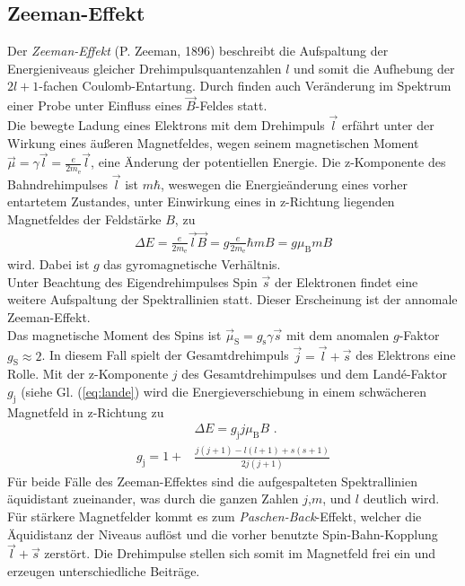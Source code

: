 \documentclass[numbers=noenddot,12pt,a4paper]{scrartcl}
\newcommand{\ix}[1]{_\text{#1}}
\newcommand{\tilt}[1]{\textit{#1}}
\begin{document}
\subsection{Zeeman-Effekt}\label{subsec:zeeman}
Der \tilt{Zeeman-Effekt} (P. Zeeman, 1896) beschreibt die Aufspaltung der Energieniveaus gleicher Drehimpulsquantenzahlen $l$ und somit die Aufhebung der $2l+1$-fachen Coulomb-Entartung. Durch finden auch Veränderung im Spektrum einer Probe unter Einfluss eines $\vec{B}$-Feldes statt.\\
Die bewegte Ladung eines Elektrons mit dem Drehimpuls $\vec{l}$ erfährt unter der Wirkung eines äußeren Magnetfeldes, wegen seinem magnetischen Moment $\vec{\mu}=\gamma\vec{l}=\frac{e}{2m\ix{e}}\vec{l}$, eine Änderung der potentiellen Energie. Die z-Komponente des Bahndrehimpulses $\vec{l}$ ist $m\hbar$, weswegen die Energieänderung eines vorher entartetem Zustandes, unter Einwirkung eines in z-Richtung liegenden Magnetfeldes der Feldstärke $B$, zu
\begin{align}
	\Delta E=\frac{e}{2m\ix{e}}\vec{l}\vec{B}=g\frac{e}{2m\ix{e}}\hbar mB=g\mu\ix{B}mB
\end{align}
wird. Dabei ist $g$ das gyromagnetische Verhältnis.\\
Unter Beachtung des Eigendrehimpulses Spin $\vec{s}$ der Elektronen findet eine weitere Aufspaltung der Spektrallinien statt. Dieser Erscheinung ist der annomale Zeeman-Effekt.\\
Das magnetische Moment des Spins ist $\vec{\mu}\ix{S}=g\ix{s}\gamma\vec{s}$ mit dem anomalen $g$-Faktor $g\ix{S}\approx2$. In diesem Fall spielt der Gesamtdrehimpuls $\vec{j}=\vec{l}+\vec{s}$ des Elektrons eine Rolle. Mit der z-Komponente $j$ des Gesamtdrehimpulses und dem Landé-Faktor $g\ix{j}$ (siehe Gl. (\ref{eq:lande}) wird die Energieverschiebung in einem schwächeren Magnetfeld in z-Richtung zu
\begin{align}
	&\Delta E=g\ix{j}j\mu\ix{B}B \,\,. \\
	g\ix{j}=1+&\frac{j\left(j+1\right)-l\left(l+1\right)+s\left(s+1\right)}{2j\left(j+1\right)} \label{eq:lande}
\end{align}
Für beide Fälle des Zeeman-Effektes sind die aufgespalteten Spektrallinien äquidistant zueinander, was durch die ganzen Zahlen $j$,$m$, und $l$ deutlich wird.\\
Für stärkere Magnetfelder kommt es zum \tilt{Paschen-Back}-Effekt, welcher die Äquidistanz der Niveaus auflöst und die vorher benutzte Spin-Bahn-Kopplung $\vec{l}+\vec{s}$ zerstört. Die Drehimpulse stellen sich somit im Magnetfeld frei ein und erzeugen unterschiedliche Beiträge.
\end{document}
